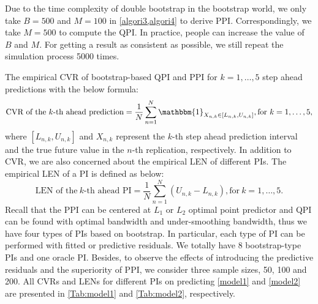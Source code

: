 \documentclass[a4paper]{article}
\begin{document}

Due to the time complexity of double bootstrap in the bootstrap world, we only take $B = 500$ and $M = 100$ in \cref{algori3,algori4} to derive PPI. Correspondingly, we take $M = 500$ to compute the QPI. In practice, people can increase the value of $B$ and $M$. For getting a result as consistent as possible, we still repeat the simulation process 5000 times. 

The empirical CVR of bootstrap-based QPI and PPI for $k = 1,\ldots,5$ step ahead predictions with the below formula:
\begin{equation}\label{CVRformula}
    \text{CVR of the}~k \text{-th ahead prediction} = \frac{1}{N}\sum_{n=1}^{N}\mathbbm{1}_{X_{n,k}\in [L_{n,k},U_{n,k}]}, \text{for}~k=1,\ldots,5,
\end{equation}
where $[L_{n,k},U_{n,k}]$ and $X_{n,k}$ represent the $k$-th step ahead prediction interval and the true future value in the $n$-th replication, respectively. In addition to CVR, we are also concerned about the empirical LEN of different PIs. The empirical LEN of a PI is defined as below:
\begin{equation}
        \text{LEN of the}~k \text{-th ahead PI} = \frac{1}{N}\sum_{n=1}^{N}(U_{n,k}-L_{n,k}), \text{for}~k=1,\ldots,5.
\end{equation}
Recall that the PPI can be centered at $L_1$ or $L_2$ optimal point predictor and QPI can be found with optimal bandwidth and under-smoothing bandwidth, thus we have four types of PIs based on bootstrap. In particular, each type of PI can be performed with fitted or predictive residuals. We totally have 8 bootstrap-type PIs and one oracle PI. Besides, to observe the effects of introducing the predictive residuals and the superiority of PPI, we consider three sample sizes, 50, 100 and 200. All CVRs and LENs for different PIs on predicting \cref{model1} and \cref{model2} are presented in \cref{Tab:model1} and \cref{Tab:model2}, respectively. 
\end{document}
